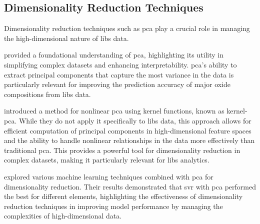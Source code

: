 \subsection{Dimensionality Reduction Techniques}
Dimensionality reduction techniques such as \gls{pca} play a crucial role in managing the high-dimensional nature of \gls{libs} data.

\citet{woldPrincipalComponentAnalysis1987} provided a foundational understanding of \gls{pca}, highlighting its utility in simplifying complex datasets and enhancing interpretability.
\gls{pca}'s ability to extract principal components that capture the most variance in the data is particularly relevant for improving the prediction accuracy of major oxide compositions from \gls{libs} data.

\citet{scholkopftKPCA} introduced a method for nonlinear \gls{pca} using kernel functions, known as \gls{kernel-pca}.
While they do not apply it specifically to \gls{libs} data, this approach allows for efficient computation of principal components in high-dimensional feature spaces and the ability to handle nonlinear relationships in the data more effectively than traditional \gls{pca}.
This provides a powerful tool for dimensionality reduction in complex datasets, making it particularly relevant for \gls{libs} analytics.

\citet{rezaei_dimensionality_reduction} explored various machine learning techniques combined with \gls{pca} for dimensionality reduction. Their results demonstrated that \gls{svr} with \gls{pca} performed the best for different elements, highlighting the effectiveness of dimensionality reduction techniques in improving model performance by managing the complexities of high-dimensional data.



